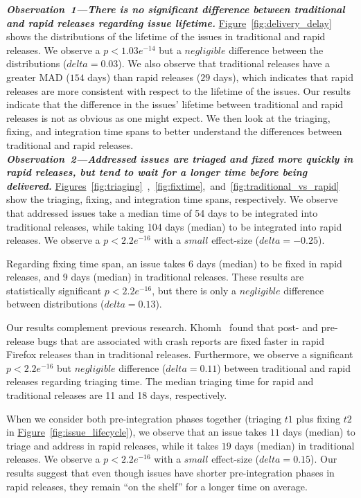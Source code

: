 \noindent\textit{\textbf{Observation~1---There is no significant difference between traditional
and rapid releases regarding issue lifetime.}}
\hyperref[fig:delivery_delay]{Figure}~\ref{fig:delivery_delay} shows the distributions of the lifetime of the
issues in traditional and rapid releases. We observe a $p<1.03e^{-14}$ but a
$negligible$ difference between the distributions ($\textit{delta}=0.03$). We
also observe that traditional releases have a greater MAD ($154$ days) than
rapid releases ($29$ days), which indicates that rapid releases are more
consistent with respect to the lifetime of the issues. Our results indicate that
the difference in the issues' lifetime between traditional and rapid releases is
not as obvious as one might expect. We then look at the triaging, fixing, and
integration time spans to better understand the differences between traditional
and rapid releases.\\

\noindent\textit{\textbf{Observation~2---Addressed issues are triaged and fixed more quickly in
rapid releases, but tend to wait for a longer time before being
delivered.}}
\hyperref[fig:triaging]{Figures}~\ref{fig:triaging}~,~\ref{fig:fixtime},~and~\ref{fig:traditional_vs_rapid}
show the triaging, fixing, and integration time spans, respectively. We observe
that addressed issues take a median time of 54 days to be integrated into
traditional releases, while taking 104 days (median) to be integrated into rapid
releases. We observe a $p<2.2e^{-16}$ with a $small$ effect-size
($delta=-0.25$).

Regarding fixing time span, an issue takes 6 days (median) to be fixed in
rapid releases, and 9 days (median) in traditional releases. These results
are statistically significant $p<2.2e^{-16}$, but there is only a $negligible$
difference between distributions ($delta=0.13$). 

Our results complement previous research. Khomh~\etal \cite{khomh2012faster}
found that post- and pre-release bugs that are associated with crash reports are
fixed faster in rapid Firefox releases than in traditional releases.
Furthermore, we observe a significant $p<2.2e^{-16}$ but $negligible$
difference ($\textit{delta}=0.11$) between traditional and rapid releases
regarding triaging time. The median triaging time for rapid and traditional
releases are 11 and 18 days, respectively.

When we consider both pre-integration phases together (triaging $t1$ plus
fixing $t2$ in \hyperref[fig:issue_lifecycle]{Figure}~\ref{fig:issue_lifecycle}), we observe that an issue takes
$11$ days (median) to triage and address in rapid releases, while
it takes $19$ days (median) in traditional releases. We observe a $p<2.2e^{-16}$ with a $small$
effect-size ($delta=0.15$). Our results suggest that even though issues have
shorter pre-integration phases in rapid releases, they remain ``on the
shelf'' for a longer time on average.


